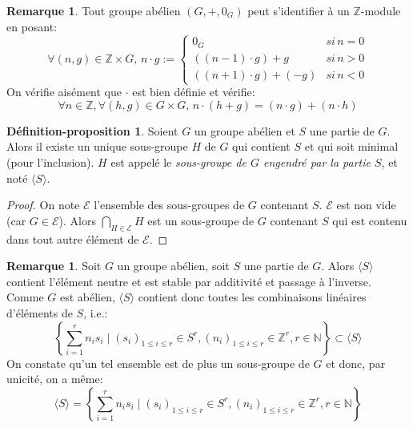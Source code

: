 \documentclass{report}
\newcommand{\Z}{\mathbb{Z}}
\newcommand{\N}{\mathbb{N}}
\newcommand{\dis}{\displaystyle}
\theoremstyle{definition}
\newtheorem{depro}[defi]{Définition-proposition}
\newtheorem{rem}[defi]{Remarque}
\begin{document}


\begin{rem}
Tout groupe ab\'elien $(G,+,0_G)$ peut s'identifier \`a un $\Z$-module en posant:
$$\forall (n,g)\in\Z\times G,\, n\cdot g:=\begin{cases}0_G & si\, n=0\\ ((n-1)\cdot g)+g & si\, n>0\\((n+1)\cdot g) + (-g) & si\, n<0\end{cases}$$
On v\'erifie ais\'ement que $\cdot$ est bien d\'efinie et v\'erifie:\\
$$\forall n\in \Z,\forall (h,g)\in G\times G,\, n\cdot(h+g)=(n\cdot g)+(n\cdot h)$$
\end{rem}

\begin{depro}
Soient $G$ un groupe abélien et $S$ une partie de $G$. Alors il existe un unique sous-groupe $H$ de $G$ qui contient $S$ et qui soit minimal (pour l'inclusion). $H$ est appelé le \textit{sous-groupe de $G$ engendré par la partie $S$}, et noté $\langle S\rangle$.
\end{depro}

\begin{proof}
On note $\mathcal{E}$ l'ensemble des sous-groupes de $G$ contenant $S$. $\mathcal{E}$ est non vide (car $G \in\mathcal{E}$). Alors $\dis \bigcap_{H \in \mathcal{E}} H$ est un sous-groupe de $G$ contenant $S$ qui est contenu dans tout autre élément de $\mathcal{E}$.
\end{proof}

\begin{rem}
Soit $G$ un groupe abélien, soit $S$ une partie de $G$. Alors $\langle S\rangle$ contient l'élément neutre et est stable par additivité et passage à l'inverse. Comme $G$ est abélien, $\langle S\rangle$ contient donc toutes les combinaisons linéaires d'éléments de $S$, i.e.:
$$\left\{\dis \sum_{i=1}^r n_is_i \mid (s_i)_{1 \leqslant i \leqslant r} \in S^r, (n_i)_{1 \leqslant i \leqslant r} \in \Z^r, r \in \N \right\}\subset\langle S\rangle$$
On constate qu'un tel ensemble est de plus un sous-groupe de $G$ et donc, par unicité, on a m\^eme:
$$\langle S\rangle=\left\{\dis \sum_{i=1}^r n_is_i \mid (s_i)_{1 \leqslant i \leqslant r} \in S^r, (n_i)_{1 \leqslant i \leqslant r} \in \Z^r, r \in \N \right\}$$
\end{rem}
\end{document}
